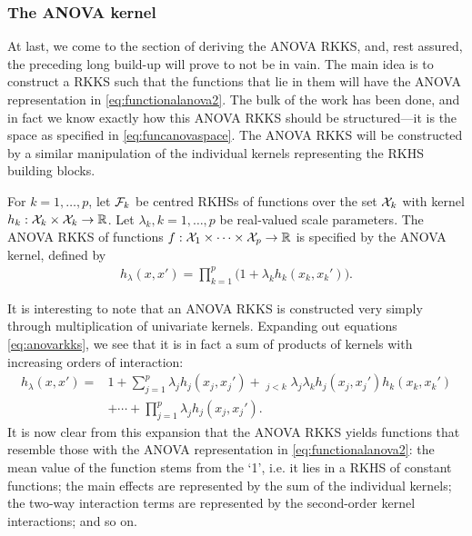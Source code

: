\subsubsection{The ANOVA kernel}

At last, we come to the section of deriving the ANOVA RKKS, and, rest assured, the preceding long build-up will prove to not be in vain.
The main idea is to construct a RKKS such that the functions that lie in them will have the ANOVA representation in \cref{eq:functionalanova2}.
The bulk of the work has been done, and in fact we know exactly how this ANOVA RKKS should be structured---it is the space as specified in \cref{eq:funcanovaspace}. 
The ANOVA RKKS will be constructed by a similar manipulation of the individual kernels representing the RKHS building blocks.

\begin{definition}\label{def:anovarkks}
  For $k=1,\dots,p$, let ${\mathcal F}_k$ be centred RKHSs of functions over the set ${\mathcal X}_k$ with kernel $h_k:{\mathcal X}_k\times{\mathcal X}_k\to\mathbb{R}$. 
  Let $\lambda_k, k=1,\dots,p$ be real-valued scale parameters.
  The ANOVA RKKS of functions $f:{\mathcal X}_1\times\cdots\times{\mathcal X}_p\to\mathbb{R}$ is specified by the ANOVA kernel, defined by
  \begin{align}\label{eq:anovarkks}
    h_\lambda(x,x') = \prod_{k=1}^p \big( 1 + \lambda_k h_k(x_k,x_k') \big).
  \end{align}
\end{definition}

It is interesting to note that an ANOVA RKKS is constructed very simply through multiplication of univariate kernels.
Expanding out equations \cref{eq:anovarkks}, we see that it is in fact a sum of products of kernels with increasing orders of interaction:
\begin{align*}
  h_\lambda(x,x') 
  ={}& 1 + \sum_{j=1}^p \lambda_j h_j(x_j,x_j') + \mathop{\sum_{j,k=1}^p}_{j<k} \lambda_j\lambda_k h_j(x_j,x_j')h_k(x_k,x_k') \\
  &+ \cdots + \prod_{j=1}^p \lambda_j h_j(x_j,x_j').
\end{align*}
It is now clear from this expansion that the ANOVA RKKS yields functions that resemble those with the ANOVA representation in \cref{eq:functionalanova2}:
the mean value of the function stems from the `1', i.e. it lies in a RKHS of constant functions; the main effects are represented by the sum of the individual kernels; the two-way interaction terms are represented by the second-order kernel interactions; and so on.

